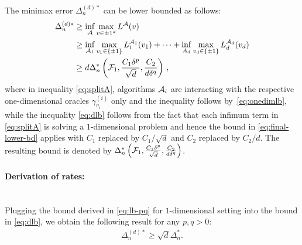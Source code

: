 The minimax error $\Delta_n^{(d)*}$ can be lower bounded as follows:
\begin{align}
\Delta_n^{(d)*}  &\ge  \inf_{\mathcal{A}} \max_{v\in {\pm 1}^d} L^{\mathcal{A}}(v) \nonumber\\
 & \ge \inf_{\mathcal{A}_1} \max_{v_1\in \{\pm 1\}} L_1^{\mathcal{A}_1}(v_1) + \dots + 
 			\inf_{A_d} \max_{v_d\in \{\pm 1 \}} L_d^{\mathcal{A}_d}(v_d) \label{eq:splitA}\\
               & \ge d \Delta_n^{*}\left(\mathcal{F}_1,\frac{C_1\delta^p}{\sqrt d}, \frac{C_2}{d\delta^q}\right)\,, \label{eq:dlb}
\end{align}
where in inequality \eqref{eq:splitA}, algorithms $\mathcal{A}_i$ are interacting with the respective one-dimensional oracles $\gamma^{(i)}_{v_i}$ only 
and the inequality follows by~\eqref{eq:onedimlb},
while the inequality \eqref{eq:dlb} follows from the fact that each infimum term in \eqref{eq:splitA} is solving a $1$-dimensional problem and hence the bound in \eqref{eq:final-lower-bd} applies with $C_1$ replaced by $C_1/\sqrt{d}$ and $C_2$ replaced by $C_2/d$. The resulting bound is denoted by $\Delta_n^{*}\left(\mathcal{F}_1,\frac{C_1\delta^p}{\sqrt d}, \frac{C_2}{d\delta^q}\right)$. 
\fi

\paragraph{Derivation of rates:}\ \\
Plugging the bound derived in \eqref{eq:lb-pq} for $1$-dimensional setting into the bound in \eqref{eq:dlb}, we obtain the following result for any $p, q >0$:
\begin{align}
\Delta_n^{(d)*} \ge  \sqrt{d}\Delta_n^{*} .
\label{eq:lb-pq-d}
\end{align}

